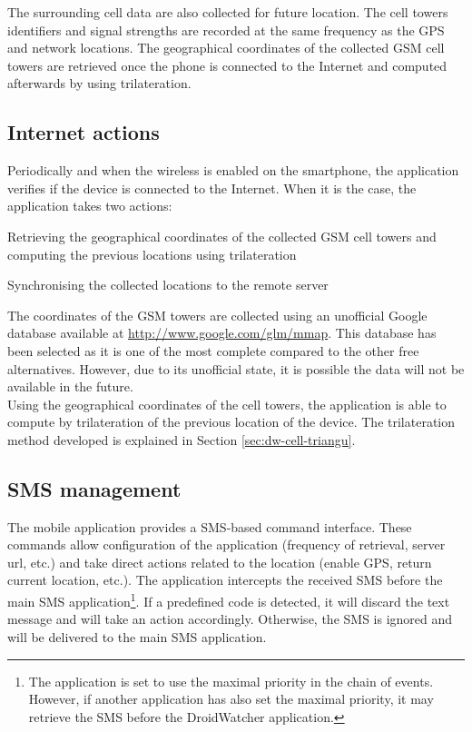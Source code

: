 The surrounding cell data are also collected for future location.
The cell towers identifiers and signal strengths are recorded at the same frequency as the GPS and network locations.
The geographical coordinates of the collected GSM cell towers are retrieved once the phone is connected to the Internet and computed afterwards by using trilateration.

\subsection{Internet actions}
\label{sec:dw-internet-actions}

Periodically and when the wireless is enabled on the smartphone, the application verifies if the device is connected to the Internet.
When it is the case, the application takes two actions:

\begin{itemizealt}
\item Retrieving the geographical coordinates of the collected GSM cell towers and computing the previous locations using trilateration
\item Synchronising the collected locations to the remote server
\end{itemizealt}

The coordinates of the GSM towers are collected using an unofficial Google database available at \url{http://www.google.com/glm/mmap}.
This database has been selected as it is one of the most complete compared to the other free alternatives.
However, due to its unofficial state, it is possible the data will not be available in the future.\\

Using the geographical coordinates of the cell towers, the application is able to compute by trilateration of the previous location of the device.
The trilateration method developed is explained in Section \ref{sec:dw-cell-triangu}.

\subsection{SMS management}
\label{sec:dw-sms-manag}

The mobile application provides a SMS-based command interface.
These commands allow configuration of the application (frequency of retrieval, server url, etc.) and take direct actions related to the location (enable GPS, return current location, etc.).
The application intercepts the received SMS before the main SMS application\footnote{The application is set to use the maximal priority in the chain of events. However, if another application has also set the maximal priority, it may retrieve the SMS before the DroidWatcher application.}.
If a predefined code is detected, it will discard the text message and will take an action accordingly.
Otherwise, the SMS is ignored and will be delivered to the main SMS application.\\

